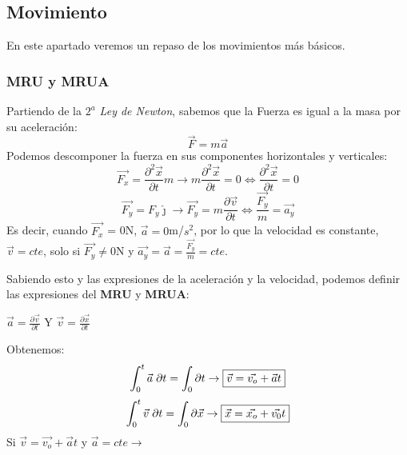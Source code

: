 \setlength{\parindent}{0ex}
\subsection{Movimiento}
En este apartado veremos un repaso de los movimientos más básicos.


\subsubsection{MRU y MRUA}

Partiendo de la \textit{\(2^a\) Ley de Newton}, sabemos que la Fuerza es igual a la masa por su aceleración:
\[\vec{F} = m\vec{a}\]
Podemos descomponer la fuerza en sus componentes horizontales y verticales:
\[
        \vec{F_{x}}=\frac{\partial^{2}\vec{x}}{\partial{t}}m
        \to
        m\frac{\partial^2 \vec{x}}{\partial t} = 0
        \Leftrightarrow
        \frac{\partial^2{\vec{x}}}{\partial{t}} = 0
\]
\[
        \vec{F_{y}}=F_{y}\hat{\jmath}
        \to
        \vec{F_y} = m\frac{\partial\vec{v}}{\partial t}\Leftrightarrow
        \frac{\vec{F_y}}{m} = \vec{a_y}
\]
Es decir, cuando \(\vec{F_x}\) = 0N, \(\vec{a}=0\)m/\(s^2\), por lo que la velocidad es constante, \(\vec{v}=cte\), solo si \(\vec{F_y}\neq 0\)N y \(\vec{a_y} = \vec{a} = \frac{\vec{F_y}}{m}=cte\).\par \vspace{0.5cm} Sabiendo esto y las expresiones de la aceleración y la velocidad, podemos definir las expresiones del \textbf{MRU} y \textbf{MRUA}: \par \vspace{0.5cm} \hspace{5cm}
\( \vec{a} = \frac{\partial \vec{v} }{\partial t}\) Y \( \vec{v} = \frac{\partial \vec{x} }{\partial t}\) \par \vspace{0.5cm} Obtenemos:
\[
        \int_{0}^{t}{\vec{a}\hspace{1mm}\partial{t}} = \int_{0}\partial{t}
        \to
        \boxed{\vec{v} = \vec{v_o} + \vec{a}t}
\]
\[
        \int_{0}^{t}{\vec{v}\hspace{1mm}\partial{t}} = \int_{0}{\partial{\vec{x}}}
        \to
        \boxed{\vec{x} = \vec{x_o} + \vec{v_0}t}
\]
\hspace{1.1cm} Si \( \vec{v} = \vec{v_o} + \vec{a}t\)
y
\( \vec{a} = cte \to\) 
\vspace{5cm}
